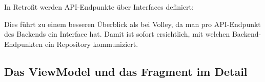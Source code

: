 \begin{Shaded}
\begin{Highlighting}[]
\NormalTok{(} \NormalTok{<}\NormalTok{>() \{}
      \NormalTok{<}
        \CommentTok{// }
\NormalTok{    \}}
      
        \CommentTok{// }
\NormalTok{    \}}
\NormalTok{\});}
\end{Highlighting}
\end{Shaded}

In Retrofit werden API-Endpunkte über Interfaces definiert:

\begin{Shaded}
\begin{Highlighting}[]
 
    \NormalTok{)}
\NormalTok{> }\NormalTok{(}\NormalTok{(}\NormalTok{) }
                         \NormalTok{(}\NormalTok{) }
\NormalTok{\}}
\end{Highlighting}
\end{Shaded}

Dies führt zu einem besseren Überblick als bei Volley, da man pro
API-Endpunkt des Backends ein Interface hat. Damit ist sofort
ersichtlich, mit welchen Backend-Endpunkten ein Repository kommuniziert.

\hypertarget{das-viewmodel-und-das-fragment-im-detail}{%
\subsection{Das ViewModel und das Fragment im
Detail}\label{das-viewmodel-und-das-fragment-im-detail}}

